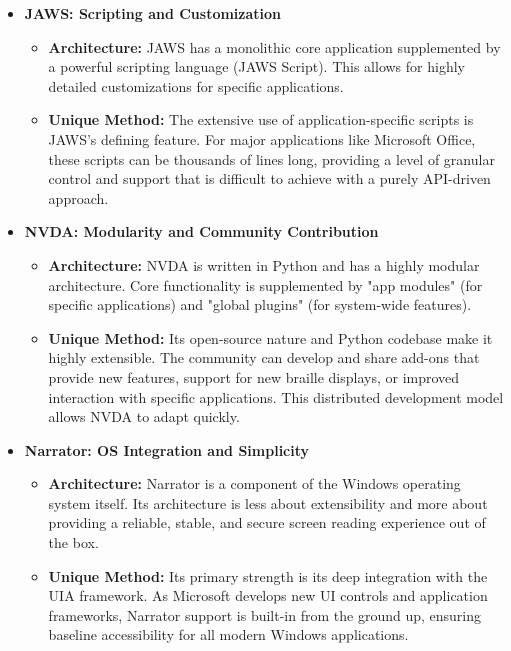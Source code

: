 \begin{itemize}
	\item \textbf{JAWS: Scripting and Customization}
	      \begin{itemize}
		      \item \textbf{Architecture:} JAWS has a monolithic core application supplemented by a powerful scripting language (JAWS Script). This allows for highly detailed customizations for specific applications.
		      \item \textbf{Unique Method:} The extensive use of application-specific scripts is JAWS's defining feature. For major applications like Microsoft Office, these scripts can be thousands of lines long, providing a level of granular control and support that is difficult to achieve with a purely API-driven approach.
	      \end{itemize}
	\item \textbf{NVDA: Modularity and Community Contribution}
	      \begin{itemize}
		      \item \textbf{Architecture:} NVDA is written in Python and has a highly modular architecture. Core functionality is supplemented by "app modules" (for specific applications) and "global plugins" (for system-wide features).
		      \item \textbf{Unique Method:} Its open-source nature and Python codebase make it highly extensible. The community can develop and share add-ons that provide new features, support for new braille displays, or improved interaction with specific applications. This distributed development model allows NVDA to adapt quickly.
	      \end{itemize}
	\item \textbf{Narrator: OS Integration and Simplicity}
	      \begin{itemize}
		      \item \textbf{Architecture:} Narrator is a component of the Windows operating system itself. Its architecture is less about extensibility and more about providing a reliable, stable, and secure screen reading experience out of the box.
		      \item \textbf{Unique Method:} Its primary strength is its deep integration with the UIA framework. As Microsoft develops new UI controls and application frameworks, Narrator support is built-in from the ground up, ensuring baseline accessibility for all modern Windows applications.
	      \end{itemize}
\end{itemize}

